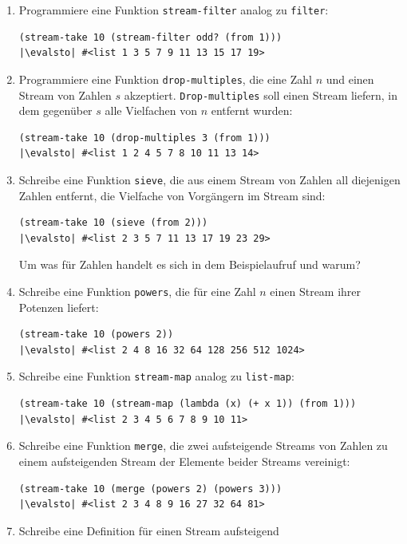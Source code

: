 \begin{aufgabe}
\begin{enumerate}
\begin{lstlisting}
     \end{lstlisting}
   \item Programmiere eine Funktion \lstinline{stream-filter} analog zu
     \lstinline{filter}:
     \begin{lstlisting}
(stream-take 10 (stream-filter odd? (from 1)))
|\evalsto| #<list 1 3 5 7 9 11 13 15 17 19>
     \end{lstlisting}
   \item Programmiere eine Funktion \lstinline{drop-multiples}, die 
     eine Zahl $n$ und einen Stream von Zahlen $s$ akzeptiert.
     \lstinline{Drop-multiples} soll einen Stream liefern, in dem
     gegenüber $s$  alle Vielfachen von $n$ entfernt wurden:
     \begin{lstlisting}
(stream-take 10 (drop-multiples 3 (from 1)))
|\evalsto| #<list 1 2 4 5 7 8 10 11 13 14>
     \end{lstlisting}
   \item Schreibe eine Funktion \lstinline{sieve}, die aus einem Stream
     von Zahlen all diejenigen Zahlen entfernt, die Vielfache von
     Vorgängern im Stream sind:
     \begin{lstlisting}
(stream-take 10 (sieve (from 2)))
|\evalsto| #<list 2 3 5 7 11 13 17 19 23 29>
     \end{lstlisting}
     Um was für Zahlen handelt es sich in dem Beispielaufruf und
     warum?
   \item Schreibe eine Funktion \lstinline{powers}, die für eine Zahl
     $n$ einen Stream ihrer Potenzen liefert:
     \begin{lstlisting}
(stream-take 10 (powers 2))
|\evalsto| #<list 2 4 8 16 32 64 128 256 512 1024>
     \end{lstlisting}
   \item Schreibe eine Funktion \lstinline{stream-map} analog zu
     \lstinline{list-map}:
     \begin{lstlisting}
(stream-take 10 (stream-map (lambda (x) (+ x 1)) (from 1)))
|\evalsto| #<list 2 3 4 5 6 7 8 9 10 11>
     \end{lstlisting}
   \item Schreibe eine Funktion \lstinline{merge}, die zwei
     aufsteigende Streams von Zahlen zu einem aufsteigenden Stream
     der Elemente beider Streams vereinigt:
     \begin{lstlisting}
(stream-take 10 (merge (powers 2) (powers 3)))
|\evalsto| #<list 2 3 4 8 9 16 27 32 64 81>
     \end{lstlisting}
   \item Schreibe eine Definition für einen Stream aufsteigend

\end{enumerate}
\end{aufgabe}
